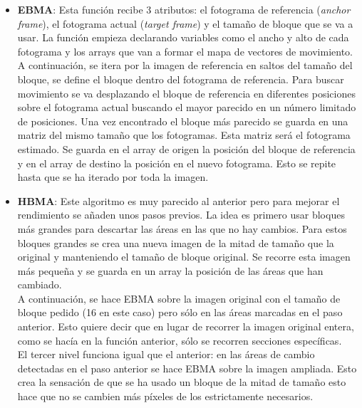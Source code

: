 \begin{itemize}
	\item \textbf{EBMA}: Esta función recibe 3 atributos: el fotograma de referencia (\emph{anchor frame}), el fotograma actual (\emph{target frame}) y el tamaño de bloque que se va a usar. La función empieza declarando variables como el ancho y alto de cada fotograma y los arrays que van a formar el mapa de vectores de movimiento.\\
 
A continuación, se itera por la imagen de referencia en saltos del tamaño del bloque, se define el bloque dentro del fotograma de referencia. Para buscar movimiento se va desplazando el bloque de referencia en diferentes posiciones sobre el fotograma actual buscando el mayor parecido en un número limitado de posiciones. Una vez encontrado el bloque más parecido se guarda en una matriz del mismo tamaño que los fotogramas. Esta matriz será el fotograma estimado. Se guarda en el array de origen la posición del bloque de referencia y en el array de destino la posición en el nuevo fotograma. Esto se repite hasta que se ha iterado por toda la imagen.\\

	\item \textbf{HBMA}: Este algoritmo es muy parecido al anterior pero para mejorar el rendimiento se añaden unos pasos previos. La idea es primero usar bloques más grandes para descartar las áreas en las que no hay cambios. Para estos bloques grandes se crea una nueva imagen de la mitad de tamaño que la original y manteniendo el tamaño de bloque original. Se recorre esta imagen más pequeña y se guarda en un array la posición de las áreas que han cambiado.\\

A continuación, se hace EBMA sobre la imagen original con el tamaño de bloque pedido (16 en este caso) pero sólo en las áreas marcadas en el paso anterior. Esto quiere decir que en lugar de recorrer la imagen original entera, como se hacía en la función anterior, sólo se recorren secciones específicas.\\

El tercer nivel funciona igual que el anterior: en las áreas de cambio detectadas en el paso anterior se hace EBMA sobre la imagen ampliada. Esto crea la sensación de que se ha usado un bloque de la mitad de tamaño esto hace que no se cambien más píxeles de los estrictamente necesarios.\\


\end{itemize}
